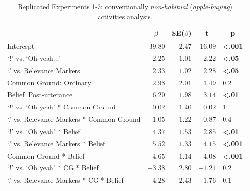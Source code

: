 \documentclass{sp}\usepackage[]{graphicx}\usepackage[]{color}
\begin{document}
\begin{table}[!tbp]
\caption{Replicated Experiments 1-3: conventionally \textit{non-habitual} (\textit{apple-buying}) activities analysis.\label{tab:oldexpallopt}} 
\begin{center}
\begin{tabular}{lrrrl}
\toprule
\multicolumn{1}{l}{}&\multicolumn{1}{c}{$\beta$}&\multicolumn{1}{c}{SE($\beta$)}&\multicolumn{1}{c}{\textbf{t}}&\multicolumn{1}{c}{\textbf{p}}\tabularnewline
\midrule
Intercept&$39.80$&$2.47$&$16.09$&\textbf{\textless .001}\tabularnewline
`!' vs. `Oh yeah...'&$ 2.25$&$1.01$&$ 2.22$&\textbf{\textless .05}\tabularnewline
`.' vs. Relevance Markers&$ 2.33$&$1.02$&$ 2.28$&\textbf{\textless .05}\tabularnewline
Common Ground: Ordinary&$ 2.98$&$2.01$&$ 1.49$&0.2\tabularnewline
Belief: Post-utterance&$ 6.20$&$1.98$&$ 3.14$&\textbf{\textless .01}\tabularnewline
`!' vs. `Oh yeah' * Common Ground&$-0.02$&$1.40$&$-0.02$&1\tabularnewline
`.' vs. Relevance Markers * Common Ground&$ 1.05$&$1.22$&$ 0.87$&0.4\tabularnewline
`!' vs. `Oh yeah' * Belief&$ 4.37$&$1.53$&$ 2.85$&\textbf{\textless .01}\tabularnewline
`.' vs. Relevance Markers * Belief&$ 5.52$&$1.33$&$ 4.15$&\textbf{\textless .001}\tabularnewline
Common Ground * Belief&$-4.65$&$1.14$&$-4.08$&\textbf{\textless .001}\tabularnewline
`!' vs. `Oh yeah' * CG * Belief&$-3.38$&$2.80$&$-1.21$&0.2\tabularnewline
`.' vs. Relevance Markers * CG * Belief&$-4.28$&$2.43$&$-1.76$&0.1\tabularnewline
\bottomrule
\end{tabular}\end{center}
\end{table}
\end{document}
